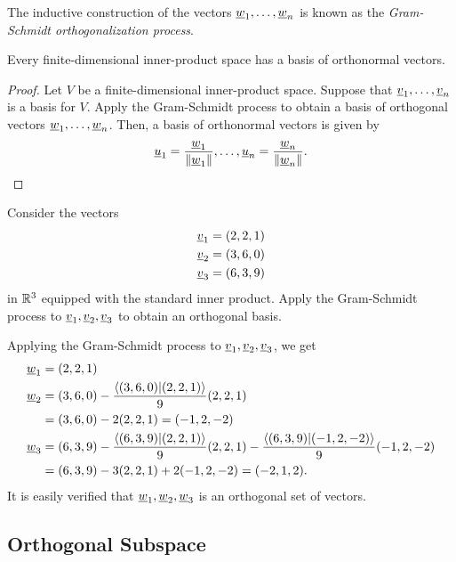 The inductive construction of the vectors $\underline{w}_1, \ldots, \underline{w}_n$ is known as the \emph{Gram-Schmidt orthogonalization process}.

\begin{corollary}
Every finite-dimensional inner-product space has a basis of orthonormal vectors.
\end{corollary}
\begin{proof}
Let $V$ be a finite-dimensional inner-product space.
Suppose that $\underline{v}_1, \ldots, \underline{v}_n$ is a basis for $V$.
Apply the Gram-Schmidt process to obtain a basis of orthogonal vectors $\underline{w}_1, \ldots, \underline{w}_n$.
Then, a basis of orthonormal vectors is given by
\begin{equation*}
\underline{u}_1 = \frac{ \underline{w}_1 }{ \left\| \underline{w}_1 \right\| }, \ldots,
\underline{u}_n = \frac{ \underline{w}_n }{ \left\| \underline{w}_n \right\| }.
\end{equation*}
\end{proof}

\begin{example}
Consider the vectors
\begin{align*}
\underline{v}_1 &= (2,2,1) \\
\underline{v}_2 &= (3,6,0) \\
\underline{v}_3 &= (6,3,9)
\end{align*}
in $\mathbb{R}^3$ equipped with the standard inner product.
Apply the Gram-Schmidt process to $\underline{v}_1, \underline{v}_2, \underline{v}_3$ to obtain an orthogonal basis.

Applying the Gram-Schmidt process to $\underline{v}_1, \underline{v}_2, \underline{v}_3$, we get
\begin{align*}
\underline{w}_1 &= (2,2,1) \\
\underline{w}_2 &= (3,6,0)
- \frac{ \left\langle (3,6,0) | (2,2,1) \right\rangle }{ 9 } (2,2,1) \\
&= (3,6,0) - 2 (2,2,1) = (-1,2,-2) \\
\underline{w}_3 &= (6,3,9)
- \frac{ \left\langle (6,3,9) | (2,2,1) \right\rangle }{ 9 } (2,2,1)
- \frac{ \left\langle (6,3,9) | (-1,2,-2) \right\rangle }{ 9 } (-1,2,-2) \\
&= (6,3,9) - 3 (2,2,1) + 2 (-1,2,-2) = (-2,1,2) .
\end{align*}
It is easily verified that $\underline{w}_1, \underline{w}_2, \underline{w}_3$ is an orthogonal set of vectors.
\end{example}


\subsection{Orthogonal Subspace}

